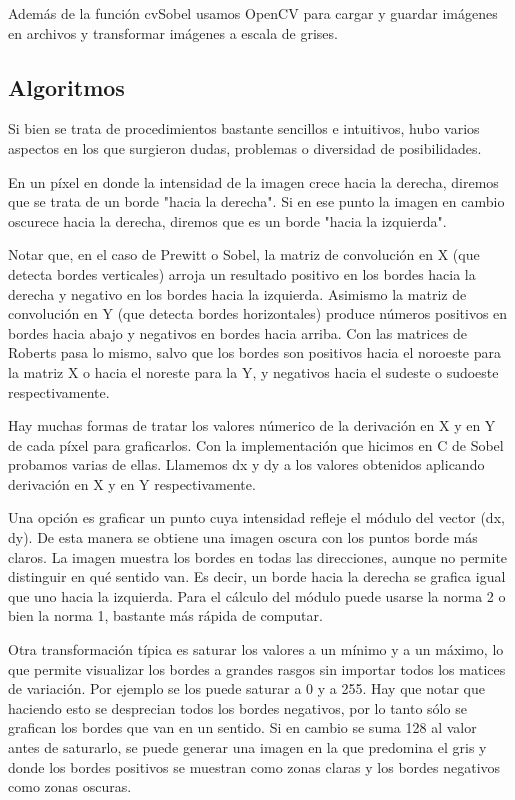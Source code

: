 Además de la función cvSobel usamos OpenCV para cargar y guardar imágenes en archivos y transformar imágenes a escala de grises.


\subsection{Algoritmos}
Si bien se trata de procedimientos bastante sencillos e intuitivos, hubo varios aspectos en los que surgieron dudas, problemas o diversidad de posibilidades.

En un píxel en donde la intensidad de la imagen crece hacia la derecha, diremos que se trata de un borde "hacia la derecha". Si en ese punto la imagen en cambio oscurece hacia la derecha, diremos que es un borde "hacia la izquierda".

Notar que, en el caso de Prewitt o Sobel, la matriz de convolución en X (que detecta bordes verticales) arroja un resultado positivo en los bordes hacia la derecha y negativo en los bordes hacia la izquierda. Asimismo la matriz de convolución en Y (que detecta bordes horizontales) produce números positivos en bordes hacia abajo y negativos en bordes hacia arriba. Con las matrices de Roberts pasa lo mismo, salvo que los bordes son positivos hacia el noroeste para la matriz X o hacia el noreste para la Y, y negativos hacia el sudeste o sudoeste respectivamente.

Hay muchas formas de tratar los valores númerico de la derivación en X y en Y de cada píxel para graficarlos. Con la implementación que hicimos en C de Sobel probamos varias de ellas. Llamemos dx y dy a los valores obtenidos aplicando derivación en X y en Y respectivamente.

Una opción es graficar un punto cuya intensidad refleje el módulo del vector (dx, dy). De esta manera se obtiene una imagen oscura con los puntos borde más claros. La imagen muestra los bordes en todas las direcciones, aunque no permite distinguir en qué sentido van. Es decir, un borde hacia la derecha se grafica igual que uno hacia la izquierda. Para el cálculo del módulo puede usarse la norma 2 o bien la norma 1, bastante más rápida de computar.

Otra transformación típica es saturar los valores a un mínimo y a un máximo, lo que permite visualizar los bordes a grandes rasgos sin importar todos los matices de variación. Por ejemplo se los puede saturar a 0 y a 255. Hay que notar que haciendo esto se desprecian todos los bordes negativos, por lo tanto sólo se grafican los bordes que van en un sentido. Si en cambio se suma 128 al valor antes de saturarlo, se puede generar una imagen en la que predomina el gris y donde los bordes positivos se muestran como zonas claras y los bordes negativos como zonas oscuras.

